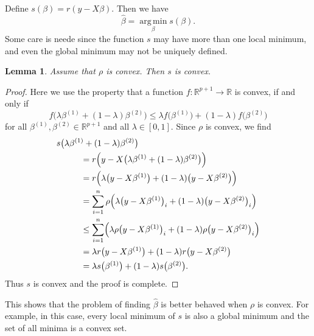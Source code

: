 \documentclass[
  a4paper,
]{article}
\newtheorem{lemma}{Lemma}[section]
\theoremstyle{definition}
\theoremstyle{definition}
\theoremstyle{definition}
\theoremstyle{definition}
\theoremstyle{remark}
\begin{document}
Define \(s(\beta) = r(y - X\beta)\). Then we have
\begin{equation}
  \hat\beta
  = \mathop{\mathrm{arg\,min}}\limits_\beta s(\beta).  \label{eq:m-est-min}
\end{equation}
Some care is neede since the function \(s\) may have more than one
local minimum, and even the global minimum may not be uniquely
defined.

\begin{lemma}
Assume that \(\rho\) is convex. Then \(s\) is convex.
\end{lemma}

\begin{proof}
Here we use the property that a function \(f\colon \mathbb{R}^{p+1} \to \mathbb{R}\) is convex,
if and only if
\begin{equation*}
  f\bigl( \lambda \beta^{(1)} + (1 - \lambda) \beta^{(2)} \bigr)
  \leq \lambda f\bigl( \beta^{(1)} \bigr) + (1 - \lambda) f\bigl( \beta^{(2)} \bigr)
\end{equation*}
for all \(\beta^{(1)}, \beta^{(2)}\in \mathbb{R}^{p+1}\) and all \(\lambda \in [0, 1]\).
Since \(\rho\) is convex, we find
\begin{align*}
  \hskip1cm&\hskip-1cm
  s\bigl( \lambda \beta^{(1)} + (1 - \lambda) \beta^{(2)} \bigr) \\
  &= r\Bigl( y - X \bigl(\lambda \beta^{(1)} + (1 - \lambda) \beta^{(2)} \bigr) \Bigr) \\
  &= r\Bigl( \lambda \bigl( y - X \beta^{(1)} \bigr)
    + (1 - \lambda) \bigl( y - X \beta^{(2)} \bigr) \Bigr) \\
  &= \sum_{i=1}^n \rho \Bigl( \lambda \bigl( y - X \beta^{(1)} \bigr)_i
    + (1 - \lambda) \bigl( y - X \beta^{(2)} \bigr)_i \Bigr) \\
  &\leq \sum_{i=1}^n \Bigl( \lambda \rho \bigl( y - X \beta^{(1)} \bigr)_i
    + (1 - \lambda) \rho \bigl( y - X \beta^{(2)} \bigr)_i \Bigr) \\
  &= \lambda r\bigl( y - X \beta^{(1)} \bigr)
    + (1 - \lambda) r\bigl( y - X \beta^{(2)} \bigr) \\
  &= \lambda s\bigl( \beta^{(1)} \bigr) + (1 - \lambda) s\bigl( \beta^{(2)} \bigr).
\end{align*}
Thus \(s\) is convex and the proof is complete.
\end{proof}

This shows that the problem of finding \(\hat\beta\) is better behaved when
\(\rho\) is convex. For example, in this case, every local minimum of \(s\) is
also a global minimum and the set of all minima is a convex set.
\end{document}
